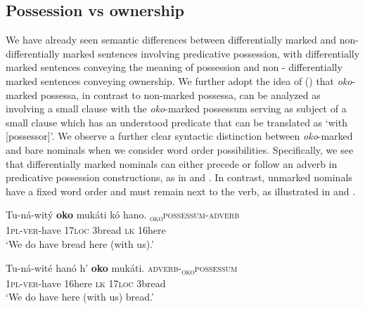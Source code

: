 \documentclass[output=paper]{langscibook}
\begin{document}
\z

\subsection{Possession vs ownership}\label{sec:schneider:subsection4.2}  

We have already seen semantic differences between differentially marked and non-differentially marked sentences involving predicative possession, with differentially marked sentences conveying the meaning of possession and non - differentially marked sentences conveying ownership. We further adopt the idea of   \citeauthor{SchneiderZiogaMutaka2019a} (\citeyear{SchneiderZiogaMutaka2019a}) that \textit{oko}-marked possessa, in contrast to non-marked possessa, can be analyzed as involving a small clause with the \textit{oko}-marked possessum serving as subject of a small clause which has an understood predicate that can be translated as ‘with [possessor]’. We observe a further clear syntactic distinction between \textit{oko}-marked and bare nominals when we consider word order possibilities. Specifically, we see that differentially marked nominals can either precede or follow an adverb in predicative possession constructions, as in  and . In contrast, unmarked nominals have a fixed word order and must remain next to the verb, as illustrated in  and .

\ea \label{ex:schneider:Possession}
\begin{xlist}

\ex \label{ex:schneider:PossessumAdverb}
\gll Tu-ná-wit\'y \textbf{oko} mukáti k\'o hano. \hspace{1cm} \textsc{\textsubscript{oko}possessum-adverb}  \\
\textsc{1pl-ver}-have \textsc{17loc} 3bread \textsc{lk} 16here \\ 
\glt `We do have bread here (with us).' 

\ex \label{ex:schneider:AdverbPossessum}
\gll Tu-ná-wit\'e han\'o h' \textbf{oko} mukáti. \hspace{0.9cm} \textsc{adverb-\textsubscript{oko}possessum} \\
\textsc{1pl-ver}-have  16here \textsc{lk} \textsc{17loc} 3bread\\ 
\glt `We do have here (with us) bread.'

\end{xlist}
\end{document}
